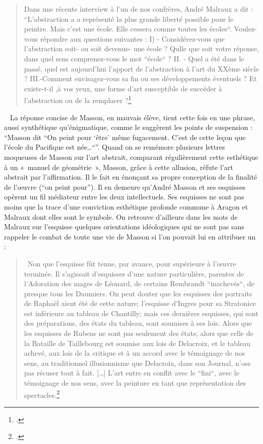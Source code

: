 \begin{quote}
Dans une récente interview à l’un de nos confrères, André Malraux a dit : “L’abstraction a a représenté la plus grande liberté possible pour le peintre. Mais c’est une école. Elle cessera comme toutes les écoles“. Voulez-vous répondre aux questions suivantes :  I) - Considérez-vous que l’abstraction soit- ou soit devenue- une école ? Qulle que soit votre réponse, dans quel sens comprenez-vous le mot “école“ ?  II. - Quel a  été dans le passé, quel est aujourd’hui l’apport de l’abstraction à l’art du XXème siècle ? III.-Comment envisagez-vous sa fin ou ses développements éventuels ? Et existe-t-il ,à vos yeux, une forme d’art susceptible de succéder à l’abstraction ou de la remplacer ?\footcite{avantgarde}
\end{quote}
 
	 La réponse concise de Masson, en mauvais élève, tient cette fois en une phrase, aussi synthétique qu’énigmatique, comme le suggèrent les points de suspension : \enquote{Masson dit “On peint pour \enquote{être} même fugacement. C’est de cette leçon que l’école du Pacifique est née…“}. Quand on se remémore plusieurs lettres moqueuses de Masson sur l’art abstrait, comparant régulièrement cette esthétique à un « manuel de géométrie », Masson, grâce à cette allusion, réfute l’art abstrait par l’affirmation. Il le fait en énonçant sa propre conception de la finalité de l’\oe{}uvre (\enquote{on peint pour}). Il en demeure qu'André Masson et ses esquisses opèrent un fil médiateur entre les deux intellectuels. Ses esquisses ne sont pas moins que la trace d'une conviction esthétique profonde commune à Aragon et Malraux dont elles sont le symbole. On retrouve d'ailleurs dans les mots de Malraux sur l'esquisse quelques orientations idéologiques qui ne sont pas sans rappeler le combat de toute une vie de Masson si l'on pouvait lui en attribuer un : 

	 \begin{quote}
	 Non que l’esquisse fût tenue, par avance, pour supérieure à l’\oe{}uvre terminée. Il s’agissait d’esquisses d’une nature particulière, parentes de l’Adoration des mages de Léonard, de certains Rembrandt “inachevés“, de presque tous les Daumiers. On peut douter que les esquisses des portraits de Raphaël aient été de cette nature; l’esquisse d’Ingres pour sa Stratonice est inférieure au tableau de Chantilly; mais ces dernières esquisses, qui sont des préparations, des états du tableau, sont soumises à ses lois. Alors que les esquisses de Rubens ne sont pas seulement des états; alors que celle de la Bataille  de Taillebourg est soumise aux lois de Delacroix, et le tableau achevé, aux lois de la critique et à un accord avec le témoignage de nos sens, au traditionnel illusionnisme que Delacroix, dans son Journal, n’ose pas récuser tout à fait. […] L’art entre en conflit avec le “fini“, avec le témoignage de nos sens, avec la peinture en tant que représentation des spectacles.\footcite[p56]{museeimaginaire}\end{quote}

